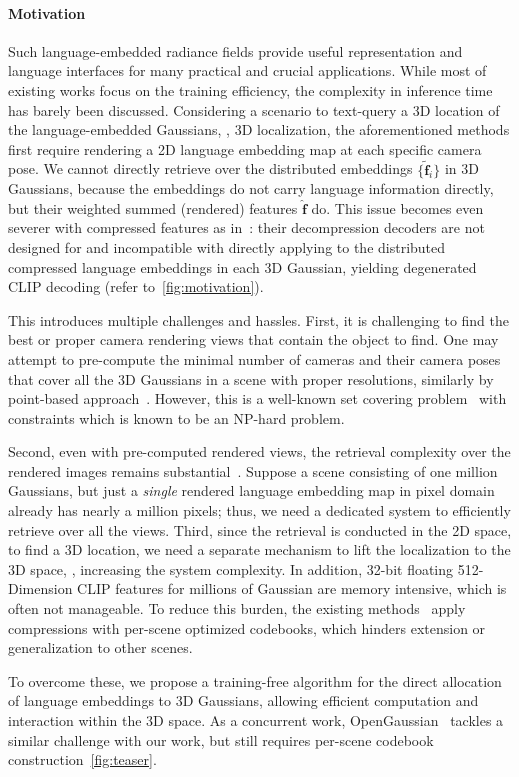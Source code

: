 \paragraph{Motivation}
Such language-embedded radiance fields provide useful representation and language interfaces for many practical and crucial applications.
While most of existing works focus on the training efficiency, the complexity in inference time has barely been discussed.
Considering a scenario to text-query a 3D location of the language-embedded Gaussians, \ie, 3D localization, the aforementioned methods first require rendering a 2D language embedding map at each specific camera pose.
We cannot directly retrieve over the distributed embeddings $\{\mathbf{\tilde f}_i\}$ in 3D Gaussians, because the embeddings do not carry language information directly, but their weighted summed (rendered) features $\mathbf{\hat{f}}$ do.
This issue becomes even severer with compressed features as in~\cite{langsplat}: their decompression decoders are not designed for and incompatible with directly applying to the distributed compressed language embeddings in each 3D Gaussian, yielding degenerated CLIP decoding (refer to~\cref{fig:motivation}).


This introduces multiple challenges and hassles.
First, it is challenging to find the best or proper camera rendering views that contain the object to find.
One may attempt to pre-compute the minimal number of cameras and their camera poses that cover all the 3D Gaussians in a scene with proper resolutions, similarly by point-based approach~\cite{openins3d}. However, this is a well-known set covering problem~\cite{garey1982computers} with constraints which is known to be an NP-hard problem.

Second, even with pre-computed rendered views, the retrieval complexity over the rendered images remains substantial~\cite{guedon2023macarons}.
Suppose a scene consisting of one million Gaussians, but just a \emph{single} rendered language embedding map in pixel domain already has nearly a million pixels; thus, we need a dedicated system to efficiently retrieve over all the views.
Third, since the retrieval is conducted in the 2D space, to find a 3D location, we need a separate mechanism to lift the localization to the 3D space, \ie, increasing the system complexity.
In addition, 32-bit floating 512-Dimension CLIP features for millions of Gaussian are memory intensive, which is often not manageable. To reduce this burden, the existing methods~\cite{open_gaussian} apply compressions with per-scene optimized codebooks, which hinders extension or generalization to other scenes.

To overcome these, we propose a training-free algorithm for the direct allocation of language embeddings to 3D Gaussians, allowing efficient computation and interaction within the 3D space. As a concurrent work, OpenGaussian~\cite{open_gaussian} tackles a similar challenge with our work, but still requires per-scene codebook construction~\cref{fig:teaser}.
